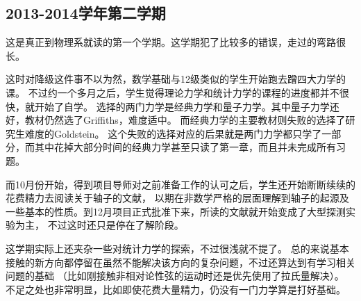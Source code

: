 \documentclass[10pt,a4paper]{article}
\begin{document}
\begin{spacing}{1.6}
\subsection{2013-2014学年第二学期}
这是真正到物理系就读的第一个学期。这学期犯了比较多的错误，走过的弯路很长。\par
这时对降级这件事不以为然，数学基础与12级类似的学生开始跑去蹭四大力学的课。
不过约一个多月之后，学生觉得理论力学和统计力学的课程的进度都并不很快，就开始了自学。
选择的两门力学是经典力学和量子力学。其中量子力学还好，教材仍然选了Griffiths\cite{grif-qm}，难度适中。
而经典力学的主要教材则失败的选择了研究生难度的Goldstein\cite{gold-cm}。
这个失败的选择对应的后果就是两门力学都只学了一部分，而其中花掉大部分时间的经典力学甚至只读了第一章，而且并未完成所有习题。
\par
而10月份开始，得到项目导师对之前准备工作的认可之后，学生还开始断断续续的花费精力去阅读关于轴子的文献，
以期在非数学严格的层面理解到轴子的起源及一些基本的性质。到12月项目正式批准下来，所读的文献就开始变成了大型探测实验为主，
不过这时还只是停在了解阶段。\par
这学期实际上还夹杂一些对统计力学的探索，不过很浅就不提了。
总的来说基本接触的新方向都停留在虽然不能解决该方向的复杂问题，不过还算达到有学习相关问题的基础
（比如刚接触非相对论性弦的运动时还是优先使用了拉氏量解决）。
不足之处也非常明显，比如即使花费大量精力，仍没有一门力学算是打好基础。


\end{spacing}
\end{document}
